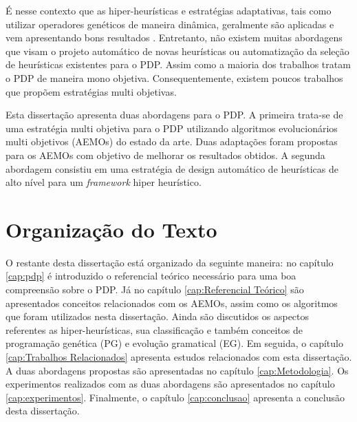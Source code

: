 É nesse contexto que as hiper-heurísticas e estratégias adaptativas, tais como utilizar operadores genéticos de maneira dinâmica, geralmente são aplicadas e vem apresentando bons resultados \cite{burke2013hyper}. Entretanto, não existem muitas abordagens que visam o projeto automático de novas heurísticas ou automatização da seleção de heurísticas existentes para o PDP. Assim como a maioria dos trabalhos tratam o PDP de maneira mono objetiva. Consequentemente, existem poucos trabalhos que propõem estratégias multi objetivas.

Esta dissertação apresenta duas abordagens para o PDP. A primeira trata-se de uma estratégia multi objetiva para o PDP utilizando algoritmos evolucionários multi objetivos (AEMOs) do estado da arte. Duas adaptações foram propostas para os AEMOs com objetivo de melhorar os resultados obtidos. A segunda abordagem consistiu em uma estratégia de design automático de heurísticas de alto nível para um \textit{framework} hiper heurístico.


\section{Organização do Texto}
\label{Introducao:Organizacao do Texto}

O restante desta dissertação está organizado da seguinte maneira: no capítulo \ref{cap:pdp} é introduzido o referencial teórico necessário para uma boa compreensão sobre o PDP. Já no capítulo \ref{cap:Referencial Teórico} são apresentados conceitos relacionados com os AEMOs, assim como os algoritmos que foram utilizados nesta dissertação. Ainda são discutidos os aspectos referentes as hiper-heurísticas, sua classificação e também conceitos de programação genética (PG) e evolução gramatical (EG). Em seguida, o capítulo \ref{cap:Trabalhos Relacionados} apresenta estudos relacionados com esta dissertação. A duas abordagens propostas são apresentadas no capítulo \ref{cap:Metodologia}. Os experimentos realizados com as duas abordagens são apresentados no capítulo \ref{cap:experimentos}. Finalmente, o capítulo \ref{cap:conclusao} apresenta a conclusão desta dissertação.







 